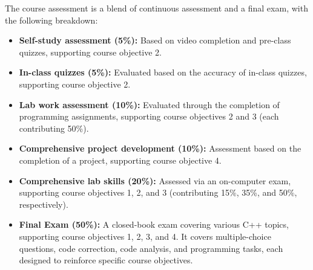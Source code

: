 The course assessment is a blend of continuous assessment and a final exam, with the following breakdown:

\begin{itemize}[topsep=0pt, partopsep=0pt, parsep=0pt, itemsep=1pt]
    \item \textbf{Self-study assessment (5\%):} Based on video completion and pre-class quizzes, supporting course objective 2.
    \item \textbf{In-class quizzes (5\%):} Evaluated based on the accuracy of in-class quizzes, supporting course objective 2.
    \item \textbf{Lab work assessment (10\%):} Evaluated through the completion of programming assignments, supporting course objectives 2 and 3 (each contributing 50\%).
    \item \textbf{Comprehensive project development (10\%):} Assessment based on the completion of a project, supporting course objective 4.
    \item \textbf{Comprehensive lab skills (20\%):} Assessed via an on-computer exam, supporting course objectives 1, 2, and 3 (contributing 15\%, 35\%, and 50\%, respectively).
    \item \textbf{Final Exam (50\%):} A closed-book exam covering various C++ topics, supporting course objectives 1, 2, 3, and 4. It covers multiple-choice questions, code correction, code analysis, and programming tasks, each designed to reinforce specific course objectives.
\end{itemize}